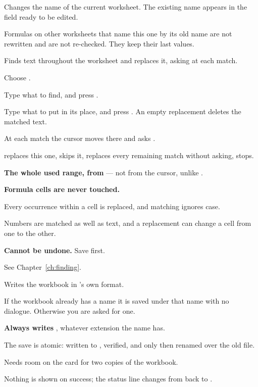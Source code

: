 Changes the name of the current worksheet. The existing name appears in the
field ready to be edited.

\begin{ccsteps}
\item Formulas on other worksheets that name this one by its old name are not
rewritten and are not re-checked. They keep their last values.
\end{ccsteps}


Finds text throughout the worksheet and replaces it, asking at each match.

\begin{ccprocedure}[]
\item Choose .
\item Type what to find, and press .
\item Type what to put in its place, and press . An empty
replacement deletes the matched text.
\item At each match the cursor moves there and \ccprod{} asks
.
\end{ccprocedure}

\begin{ccsteps}
\item {} replaces this one,  skips it,  replaces every
remaining match without asking,  stops.
\item \textbf{The whole used range, from } --- not from the cursor,
unlike .
\item \textbf{Formula cells are never touched.}
\item Every occurrence within a cell is replaced, and matching ignores case.
\item Numbers are matched as well as text, and a replacement can change a cell
from one to the other.
\item \textbf{Cannot be undone.} Save first.
\item See Chapter~\ref{ch:finding}.
\end{ccsteps}


Writes the workbook in \ccprod's own  format.

\begin{ccsteps}
\item If the workbook already has a name it is saved under that name with no
dialogue. Otherwise you are asked for one.
\item \textbf{Always writes }, whatever extension the name has.
\item The save is atomic: written to , verified, and only
then renamed over the old file.
\item Needs room on the card for two copies of the workbook.
\item Nothing is shown on success; the status line changes from 
back to .
\end{ccsteps}

